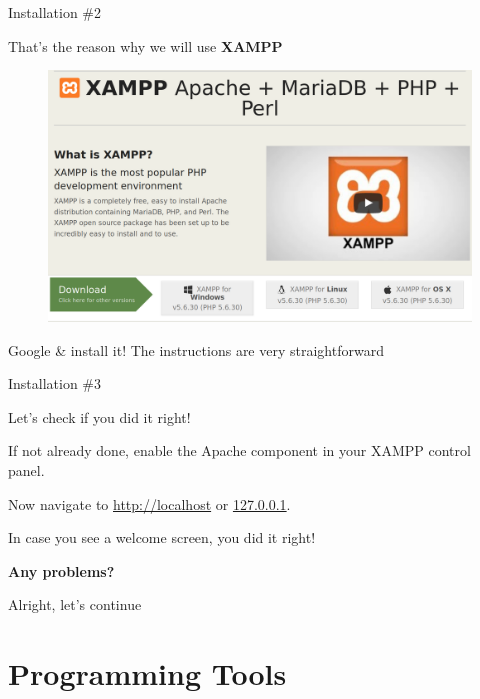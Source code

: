 \begin{frame}{Installation \#{}2}

	That's the reason why we will use \textbf{XAMPP} \pause
	\begin{figure}
  		\includegraphics[width=\linewidth]{img/xampp.png}
	\end{figure}

	\pause

	Google \& install it! The instructions are very straightforward

\end{frame}

\begin{frame}{Installation \#{}3}

	Let's check if you did it right!

	If not already done, enable the Apache component in your XAMPP control panel. \pause

	Now navigate to \url{http://localhost} or \url{127.0.0.1}.

	In case you see a welcome screen, you did it right!

	\textbf{Any problems?} \pause

	Alright, let's continue

\end{frame}


\section{Programming Tools}

